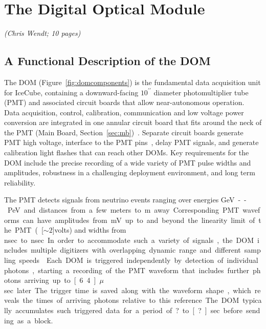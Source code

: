 
\newcommand{\degC}[1]{$\unit[#1]{^\circ{C}}$}
\def\lsim{\mathrel{\rlap{\raise 0.2ex\hbox{$\,<\,$}}{\lower 0.9ex\hbox{$\,\sim\,$}}}}
\def\gsim{\mathrel{\rlap{\raise 0.2ex\hbox{$\,>\,$}}{\lower 0.9ex\hbox{$\,\sim\,$}}}}


\section{The Digital Optical Module}
\textsl{(Chris Wendt; 10 pages)}

\subsection{\label{sec:dom_functional} A Functional Description of the DOM}

The DOM (Figure~\ref{fig:domcomponents}) is the fundamental data acquisition
unit for IceCube, 
containing a downward-facing $10^{\prime\prime}$ diameter photomultiplier tube (PMT)
and associated circuit boards that allow near-autonomous operation.
Data acquisition, control, calibration, communication and low voltage power conversion 
are integrated in one annular circuit board that fits around the neck of the PMT (Main Board, Section~\ref{sec:mb})~\cite{ref:domdaq}. 
Separate circuit boards generate PMT high voltage, interface to the PMT pins~\cite{ref:pmt},
delay PMT signals, and generate calibration light flashes that can reach other DOMs.
Key requirements for the DOM include
the precise recording of a wide variety of PMT pulse widths and amplitudes, robustness in
a challenging deployment environment, and long term reliability.

The PMT detects
signals from neutrino events ranging over energies \unit[10]GeV--\unit[10]PeV
and  distances  from a few meters to \unit[500]m away.
Corresponding PMT waveforms can have amplitudes from \unit[1]mV up to and beyond the linearity limit
of the PMT (\unit[$\sim2$]volts) and widths from \unit[12]nsec to \unit[1500]nsec.
In order to accommodate such a variety of signals,
the DOM includes multiple digitizers with overlapping dynamic range and different sampling speeds
~\cite{ref:domdaq}.
Each DOM is triggered independently by detection of individual photons, starting a 
recording of the PMT waveform that includes further photons arriving up to \unit[6.4]{$\mu$sec} later.
The trigger time is saved along with the
waveform shape, which reveals the times of arriving photons relative to this reference.
The DOM typically accumulates such triggered data for a period of ? to \unit[?]sec before sending as a block.

